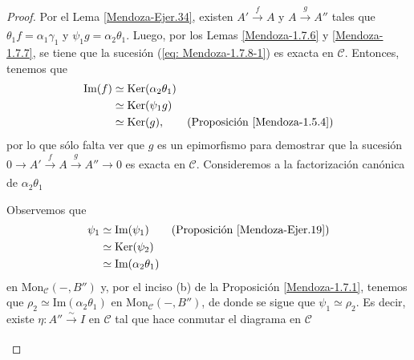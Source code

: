 \documentclass[tesis]{subfiles}
\begin{document}
\begin{proof}
    Por el Lema \ref{Mendoza-Ejer.34}, existen $A'\xrightarrow[]{f}A$ y $A\xrightarrow[]{g}A''$ tales que $\theta_1f = \alpha_1\gamma_1$ y $\psi_1g = \alpha_2\theta_1$. Luego, por los Lemas \ref{Mendoza-1.7.6} y \ref{Mendoza-1.7.7}, se tiene que la sucesión (\ref{eq: Mendoza-1.7.8-1}) es exacta en $\mathscr{C}$. Entonces, tenemos que
    \begin{align*}
        \text{Im}(f) &\simeq \text{Ker}(\alpha_2\theta_1) \\
                     &\simeq \text{Ker}(\psi_1 g) \\
                     &\simeq \text{Ker}(g), \tag{Proposición \ref{Mendoza-1.5.4}}
    \end{align*}
    por lo que sólo falta ver que $g$ es un epimorfismo para demostrar que la sucesión $0\to A'\xrightarrow[]{f} A\xrightarrow[]{g} A''\to 0$ es exacta en $\mathscr{C}$. Consideremos a la factorización canónica de $\alpha_2\theta_1$
    \begin{center}
    \end{center}
    Observemos que
    \begin{align*}
        \psi_1 &\simeq \text{Im}(\psi_1) \tag{Proposición \ref{Mendoza-Ejer.19}} \\
             &\simeq \text{Ker}(\psi_2) \\
             &\simeq \text{Im}(\alpha_2\theta_1)
    \end{align*}
    en $\text{Mon}_\mathscr{C}(-,B'')$ y, por el inciso (b) de la Proposición \ref{Mendoza-1.7.1}, tenemos que $\rho_2\simeq\text{Im}(\alpha_2\theta_1)$ en $\text{Mon}_\mathscr{C}(-,B'')$, de donde se sigue que $\psi_1\simeq\rho_2$. Es decir, existe $\eta:A''\xrightarrow[]{\sim} I$ en $\mathscr{C}$ tal que hace conmutar el diagrama en $\mathscr{C}$
    \begin{center}
\end{center}
\end{proof}
\end{document}
